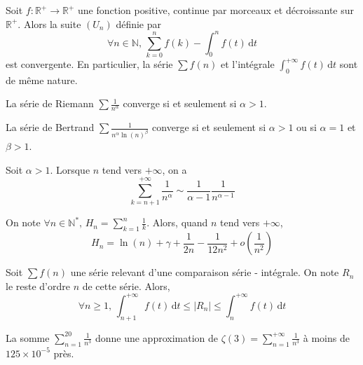 
  \begin{proposition}
    Soit $f : \mathbb{R}^+ \rightarrow \mathbb{R}^+$ une fonction positive, continue par morceaux et décroissante sur $\mathbb{R}^+$. Alors la suite $(U_n)$ définie par
    \[ \forall n \in \mathbb{N}, \, \sum_{k=0}^n f(k) - \int_0^n f(t) \, \mathrm{d}t \]
    est convergente. En particulier, la série $\sum f(n)$ et l'intégrale $\int_0^{+\infty} f(t) \, \mathrm{d}t$ sont de même nature.
  \end{proposition}

  \begin{example}
    La série de Riemann $\sum \frac{1}{n^\alpha}$ converge si et seulement si $\alpha > 1$.
  \end{example}

  \begin{example}
    La série de Bertrand $\sum \frac{1}{n^\alpha \ln(n)^\beta}$ converge si et seulement si $\alpha > 1$ ou si $\alpha = 1$ et $\beta > 1$.
  \end{example}
  
  
  \begin{lemma}
    Soit $\alpha > 1$. Lorsque $n$ tend vers $+\infty$, on a
    \[ \sum_{k=n+1}^{+\infty} \frac{1}{n^\alpha} \sim \frac{1}{\alpha - 1} \frac{1}{n^{\alpha - 1}} \]
  \end{lemma}
  

  \begin{application}
    On note $\forall n \in \mathbb{N}^*, \, H_n = \sum_{k=1}^{n} \frac{1}{k}$. Alors, quand $n$ tend vers $+\infty$,
    \[ H_n = \ln(n) + \gamma + \frac{1}{2n} - \frac{1}{12n^2} + o\left( \frac{1}{n^2} \right) \]
  \end{application}


  \begin{proposition}
    Soit $\sum f(n)$ une série relevant d'une comparaison série - intégrale. On note $R_n$ le reste d'ordre $n$ de cette série. Alors,
    \[ \forall n \geq 1, \, \int_{n+1}^{+\infty} f(t) \, \mathrm{d}t \leq |R_n| \leq \int_{n}^{+\infty} f(t) \, \mathrm{d}t \]
  \end{proposition}

  \begin{example}
    La somme $\sum_{n=1}^{20} \frac{1}{n^3}$ donne une approximation de $\zeta(3) = \sum_{n=1}^{+\infty} \frac{1}{n^3}$ à moins de $125 \times 10^{-5}$ près.
  \end{example}

